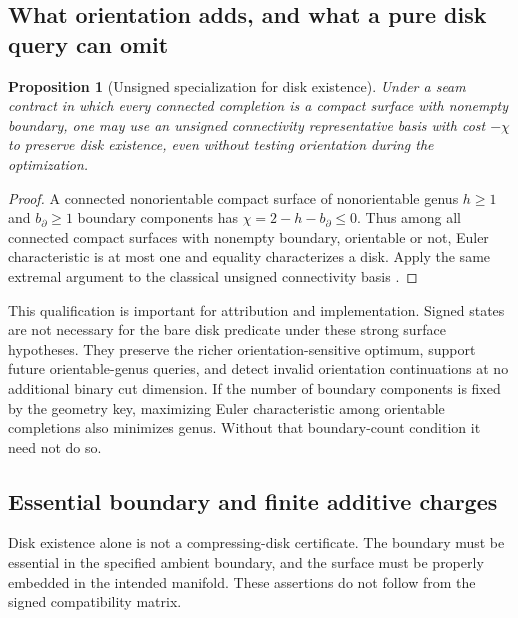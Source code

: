 \documentclass[11pt,letterpaper]{article}
\newtheorem{proposition}[theorem]{Proposition}
\theoremstyle{definition}
\begin{document}
\subsection{What orientation adds, and what a pure disk query can omit}
\begin{proposition}[Unsigned specialization for disk existence]\label{prop:unsigned-disk}
Under a seam contract in which every connected completion is a compact surface with nonempty boundary, one may use an unsigned connectivity representative basis with cost $-\chi$ to preserve disk existence, even without testing orientation during the optimization.
\end{proposition}
\begin{proof}
A connected nonorientable compact surface of nonorientable genus $h\ge1$ and $b_{\partial}\ge1$ boundary components has $\chi=2-h-b_{\partial}\le0$. Thus among all connected compact surfaces with nonempty boundary, orientable or not, Euler characteristic is at most one and equality characterizes a disk. Apply the same extremal argument to the classical unsigned connectivity basis \cite{bckn}.
\end{proof}
This qualification is important for attribution and implementation. Signed states are not necessary for the bare disk predicate under these strong surface hypotheses. They preserve the richer orientation-sensitive optimum, support future orientable-genus queries, and detect invalid orientation continuations at no additional binary cut dimension. If the number of boundary components is fixed by the geometry key, maximizing Euler characteristic among orientable completions also minimizes genus. Without that boundary-count condition it need not do so.

\subsection{Essential boundary and finite additive charges}
Disk existence alone is not a compressing-disk certificate. The boundary must be essential in the specified ambient boundary, and the surface must be properly embedded in the intended manifold. These assertions do not follow from the signed compatibility matrix.
\end{document}
